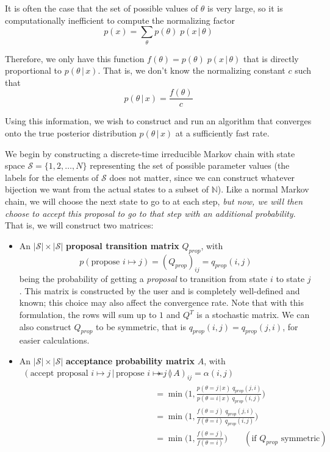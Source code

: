 \documentclass{article}
\begin{document}
  It is often the case that the set of possible values of $\theta$ is very large, so it is computationally inefficient to compute the normalizing factor
  \begin{equation}
    p(x) = \sum_\theta p(\theta) \; p(x\,|\,\theta)
  \end{equation}

  Therefore, we only have this function $f(\theta) = p(\theta) \; p(x\,|\,\theta)$ that is directly proportional to $p(\theta\,|\,x)$. That is, we don't know the normalizing constant $c$ such that
  \begin{equation}
    p(\theta\,|\,x) = \frac{f(\theta)}{c}
  \end{equation}

  Using this information, we wish to construct and run an algorithm that converges onto the true posterior distribution $p(\theta\,|\,x)$ at a sufficiently fast rate.

  We begin by constructing a discrete-time irreducible Markov chain with state space $\mathcal{S} = \{1, 2, \ldots, N\}$ representing the set of possible parameter values (the labels for the elements of $\mathcal{S}$ does not matter, since we can construct whatever bijection we want from the actual states to a subset of $\mathbb{N}$). Like a normal Markov chain, we will choose the next state to go to at each step, \textit{but now, we will then choose to accept this proposal to go to that step with an additional probability}. That is, we will construct two matrices:

  \begin{itemize}
    \item An $|\mathcal{S}| \times |\mathcal{S}|$ \textbf{proposal transition matrix} $Q_{prop}$, with
    \begin{equation}
      p(\text{propose } i \mapsto j) = (Q_{prop})_{ij} = q_{prop} (i, j)
    \end{equation}
    being the probability of getting a \textit{proposal} to transition from state $i$ to state $j$. This matrix is constructed by the user and is completely well-defined and known; this choice may also affect the convergence rate. Note that with this formulation, the rows will sum up to $1$ and $Q^T$ is a stochastic matrix. We can also construct $Q_{prop}$ to be symmetric, that is $q_{prop}(i, j) = q_{prop} (j, i)$, for easier calculations.

    \item An $|\mathcal{S}| \times |\mathcal{S}|$ \textbf{acceptance probability matrix} $A$, with
    \begin{align*}
      (\text{accept proposal }i \mapsto j\,|\, \text{propose } i \mapsto j) & = (A)_{ij} = \alpha(i, j) \\
      & = \min \bigg(1, \frac{p(\theta = j \,|\, x)\; q_{prop}(j, i)}{p(\theta = i\,|\, x) \; q_{prop}(i, j)} \bigg) \\
      & = \min\bigg(1, \frac{f(\theta = j) \; q_{prop}(j, i)}{f(\theta = i) \; q_{prop}(i, j)} \bigg) \\
      & = \min\bigg(1, \frac{f(\theta = j)}{f(\theta = i)} \bigg) \;\;\;\;\;\;\; (\text{if } Q_{prop} \text{ symmetric})
    \end{align*}
  \end{itemize}
\end{document}
